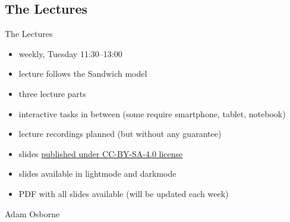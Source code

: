 
\subsection{The Lectures}
\begin{frame}{\insertsubsection}
	\begin{fancycolumns}[widths={60}]
		\begin{definition}{The Lectures}
			\begin{itemize}
				\item weekly, Tuesday 11:30--13:00
				\item lecture follows the Sandwich model
				\item three lecture parts
				\item interactive tasks in between (some require smartphone, tablet, notebook)
				\item lecture recordings planned (but without any guarantee)
				\item slides \href{https://github.com/TUBS-ISF/Course-on-Software-Engineering}{published under CC-BY-SA-4.0 license}
				\item slides available in lightmode and darkmode
				\item PDF with all slides available (will be updated each week)
			\end{itemize}
		\end{definition}
	\nextcolumn
		\begin{note}{Adam Osborne} %
		\end{note}
	\end{fancycolumns}
\end{frame}

